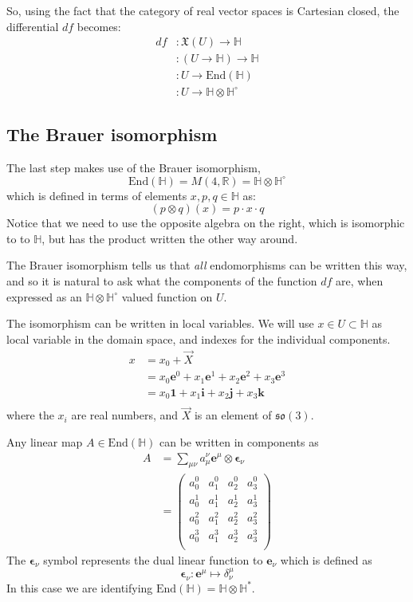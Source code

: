 \documentclass{amsart}
\providecommand{\R}{\mathbb{R}}
\providecommand{\HH}{\mathbb{H}}
\providecommand{\so}{\mathfrak{so}}
\newcommand{\End}{\mathrm{End}}
\newcommand{\e}{\boldsymbol{e}}
\newcommand{\ep}{\boldsymbol{\epsilon}}
\newcommand{\1}{\boldsymbol{1}}
\renewcommand{\i}{\boldsymbol{i}}
\renewcommand{\j}{\boldsymbol{j}}
\renewcommand{\k}{\boldsymbol{k}}
\begin{document}
So, using the fact that the category of real vector spaces is Cartesian closed,
the differential $df$ becomes:
\begin{align*}
  df &: \mathfrak{X}(U) \to \HH \\
     &: (U \to \HH) \to \HH \\
     &: U \to \End(\HH) \\
     &: U \to \HH \otimes \HH^\circ
\end{align*}



\subsection{The Brauer isomorphism}

The last step makes use of the Brauer isomorphism,
$$ \End(\HH) = M(4, \R) = \HH \otimes \HH^\circ $$
which is defined in terms of elements $x,p,q\in\HH$ as:
$$ (p\otimes q)(x) = p \cdot x \cdot q $$
Notice that we need to use the opposite algebra on the right, which is
isomorphic to to $\HH$, but has the product written the other way around.

The Brauer isomorphism tells us that \emph{all} endomorphisms can be written
this way, and so it is natural to ask what the components of the function $df$
are, when expressed as an $\HH\otimes\HH^\circ$ valued function on $U$.

The isomorphism can be written in local variables. We will use $x\in U\subset
\HH$ as local variable in the domain space, and indexes for the individual
components.
\begin{align*}
  x &= x_0 + \vec{X} \\
    &= x_0\e^0 + x_1\e^1 + x_2\e^2 + x_3\e^3 \\
    &= x_0\1 + x_1\i + x_2\j + x_3\k \\
\end{align*}
where the $x_i$ are real numbers, and $\vec{X}$ is an element of $\so(3)$.

Any linear map $A \in \End(\HH) $ can be written in components as
\begin{align*}
  A &= \sum_{\mu\nu} a_\mu^\nu \e^\mu \otimes \ep_\nu \\
    &= \begin{pmatrix}
      a_0^0 & a_1^0 & a_2^0 & a_3^0 \\
      a_0^1 & a_1^1 & a_2^1 & a_3^1 \\
      a_0^2 & a_1^2 & a_2^2 & a_3^2 \\
      a_0^3 & a_1^3 & a_2^3 & a_3^3 \\
    \end{pmatrix}
\end{align*}
The $\ep_\nu$ symbol represents the dual linear function to $\e_\nu$ which is defined as
$$\ep_\nu : \e^\mu \mapsto \delta_\nu^\mu$$
In this case we are identifying $\End(\HH) = \HH\otimes\HH^*$.
\end{document}

